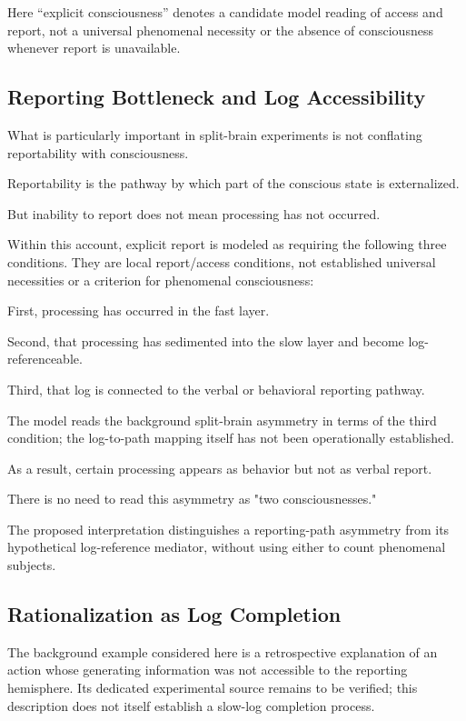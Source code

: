 Here ``explicit consciousness'' denotes a candidate model reading of access and report, not a universal phenomenal necessity or the absence of consciousness whenever report is unavailable.

\subsection{Reporting Bottleneck and Log Accessibility}


What is particularly important in split-brain experiments is not conflating reportability with consciousness.

Reportability is the pathway by which part of the conscious state is externalized.

But inability to report does not mean processing has not occurred.

Within this account, explicit report is modeled as requiring the following three conditions. They are local report/access conditions, not established universal necessities or a criterion for phenomenal consciousness:

First, processing has occurred in the fast layer.

Second, that processing has sedimented into the slow layer and become log-referenceable.

Third, that log is connected to the verbal or behavioral reporting pathway.

The model reads the background split-brain asymmetry in terms of the third condition; the log-to-path mapping itself has not been operationally established.

As a result, certain processing appears as behavior but not as verbal report.

There is no need to read this asymmetry as "two consciousnesses."

The proposed interpretation distinguishes a reporting-path asymmetry from its hypothetical log-reference mediator, without using either to count phenomenal subjects.

\subsection{Rationalization as Log Completion}


The background example considered here is a retrospective explanation of an action whose generating information was not accessible to the reporting hemisphere. Its dedicated experimental source remains to be verified; this description does not itself establish a slow-log completion process.

